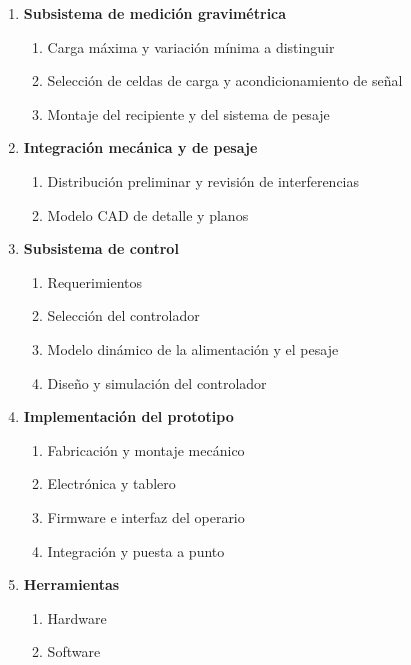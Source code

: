 \begin{enumerate}[label*=\arabic*.]
\begin{enumerate}[label*=\arabic*.]
        \item \textbf{Subsistema de medición gravimétrica}
        \begin{enumerate}[label*=\arabic*.]
            \item Carga máxima y variación mínima a distinguir
            \item Selección de celdas de carga y acondicionamiento de señal
            \item Montaje del recipiente y del sistema de pesaje
        \end{enumerate}

        \item \textbf{Integración mecánica y de pesaje}
        \begin{enumerate}[label*=\arabic*.]
            \item Distribución preliminar y revisión de interferencias
            \item Modelo CAD de detalle y planos
        \end{enumerate}

        \item \textbf{Subsistema de control}
        \begin{enumerate}[label*=\arabic*.]
            \item Requerimientos
            \item Selección del controlador
            \item Modelo dinámico de la alimentación y el pesaje
            \item Diseño y simulación del controlador
        \end{enumerate}

        \item \textbf{Implementación del prototipo}
        \begin{enumerate}[label*=\arabic*.]
            \item Fabricación y montaje mecánico
            \item Electrónica y tablero
            \item Firmware e interfaz del operario
            \item Integración y puesta a punto
        \end{enumerate}

        \item \textbf{Herramientas}
        \begin{enumerate}[label*=\arabic*.]
            \item Hardware
            \item Software
        \end{enumerate}


\end{enumerate}
\end{enumerate}
